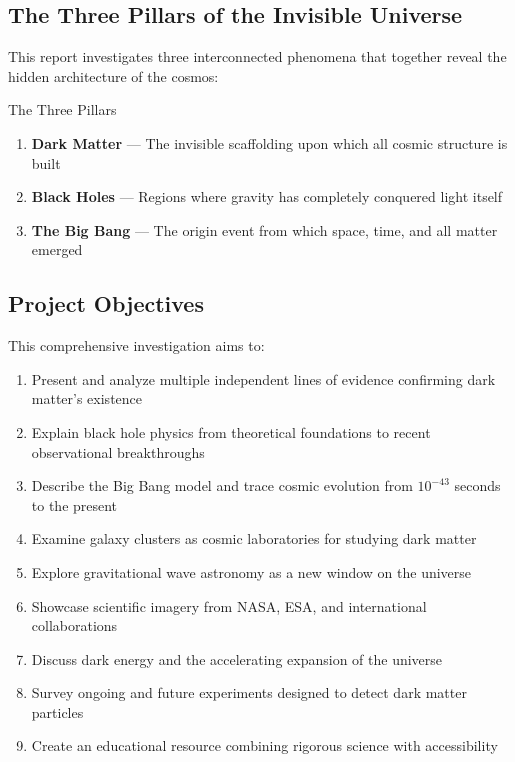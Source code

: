 \documentclass[11pt,a4paper]{article}
\begin{document}
\subsection{The Three Pillars of the Invisible Universe}

This report investigates three interconnected phenomena that together reveal the hidden architecture of the cosmos:

\begin{conceptbox}{The Three Pillars}
\begin{enumerate}[noitemsep]
    \item \textbf{Dark Matter} --- The invisible scaffolding upon which all cosmic structure is built
    \item \textbf{Black Holes} --- Regions where gravity has completely conquered light itself
    \item \textbf{The Big Bang} --- The origin event from which space, time, and all matter emerged
\end{enumerate}
\end{conceptbox}

\subsection{Project Objectives}

This comprehensive investigation aims to:

\begin{enumerate}[noitemsep]
    \item Present and analyze multiple independent lines of evidence confirming dark matter's existence
    \item Explain black hole physics from theoretical foundations to recent observational breakthroughs
    \item Describe the Big Bang model and trace cosmic evolution from $10^{-43}$ seconds to the present
    \item Examine galaxy clusters as cosmic laboratories for studying dark matter
    \item Explore gravitational wave astronomy as a new window on the universe
    \item Showcase scientific imagery from NASA, ESA, and international collaborations
    \item Discuss dark energy and the accelerating expansion of the universe
    \item Survey ongoing and future experiments designed to detect dark matter particles
    \item Create an educational resource combining rigorous science with accessibility
\end{enumerate}
\end{document}
